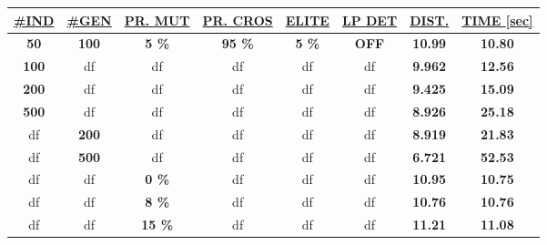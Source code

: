 \begin{table}[!]
\centering
\begin{tabular}{|c|c|c|c|c|c|c|c|}
\hline
{\ul \textbf{\#IND}} & {\ul \textbf{\#GEN}} & {\ul \textbf{PR. MUT}} & {\ul \textbf{PR. CROS}} & {\ul \textbf{ELITE}} & {\ul \textbf{LP DET}} & {\ul \textbf{DIST.}} & {\ul \textbf{TIME {[}sec{]}}} \\ \hline
\textbf{50}          & \textbf{100}         & \textbf{5 \%}          & \textbf{95 \%}          & \textbf{5 \%}        & \textbf{OFF}          & \textbf{10.99}       & \textbf{10.80}                 \\ \hline
\textbf{100}         & df                   & df                     & df                      & df                   & df                    & \textbf{9.962}        & \textbf{12.56}                \\ \hline
\textbf{200}         & df                   & df                     & df                      & df                   & df                    & \textbf{9.425}        & \textbf{15.09}                \\ \hline
\textbf{500}         & df                   & df                     & df                      & df                   & df                    & \textbf{8.926}        & \textbf{25.18}                \\ \hline
df                   & \textbf{200}         & df                     & df                      & df                   & df                    & \textbf{8.919}        & \textbf{21.83}                \\ \hline
df                   & \textbf{500}         & df                     & df                      & df                   & df                    & \textbf{6.721}        & \textbf{52.53}                \\ \hline
df                   & df                   & \textbf{0 \%}          & df                      & df                   & df                    & \textbf{10.95}       & \textbf{10.75}                \\ \hline
df                   & df                   & \textbf{8 \%}          & df                      & df                   & df                    & \textbf{10.76}       & \textbf{10.76}                \\ \hline
df                   & df                   & \textbf{15 \%}         & df                      & df                   & df                    & \textbf{11.21}       & \textbf{11.08}                \\ \hline

\end{tabular}
\end{table}
